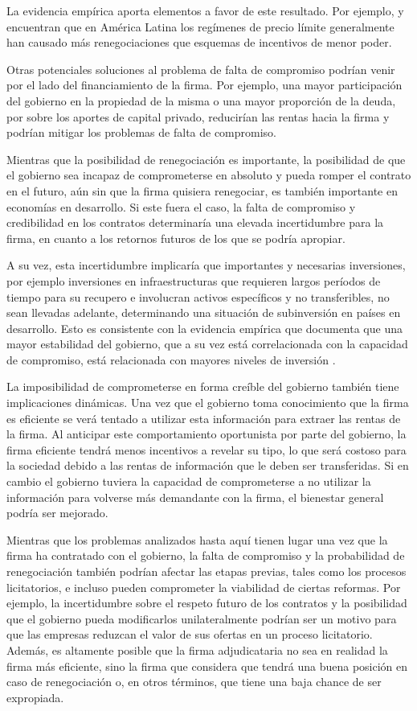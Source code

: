 \documentclass[
  12pt,
  spanish,
]{book}
\begin{document}
La evidencia empírica aporta elementos a favor de este resultado. Por
ejemplo, \citet{Guasch2007} y \citet{Guasch2008} encuentran que en
América Latina los regímenes de precio límite generalmente han causado
más renegociaciones que esquemas de incentivos de menor poder.

Otras potenciales soluciones al problema de falta de compromiso podrían
venir por el lado del financiamiento de la firma. Por ejemplo, una mayor
participación del gobierno en la propiedad de la misma o una mayor
proporción de la deuda, por sobre los aportes de capital privado,
reducirían las rentas hacia la firma y podrían mitigar los problemas de
falta de compromiso.

Mientras que la posibilidad de renegociación es importante, la
posibilidad de que el gobierno sea incapaz de comprometerse en absoluto
y pueda romper el contrato en el futuro, aún sin que la firma quisiera
renegociar, es también importante en economías en desarrollo. Si este
fuera el caso, la falta de compromiso y credibilidad en los contratos
determinaría una elevada incertidumbre para la firma, en cuanto a los
retornos futuros de los que se podría apropiar.

A su vez, esta incertidumbre implicaría que importantes y necesarias
inversiones, por ejemplo inversiones en infraestructuras que requieren
largos períodos de tiempo para su recupero e involucran activos
específicos y no transferibles, no sean llevadas adelante, determinando
una situación de subinversión en países en desarrollo. Esto es
consistente con la evidencia empírica que documenta que una mayor
estabilidad del gobierno, que a su vez está correlacionada con la
capacidad de compromiso, está relacionada con mayores niveles de
inversión \citep{Banerjee2006}.

La imposibilidad de comprometerse en forma creíble del gobierno también
tiene implicaciones dinámicas. Una vez que el gobierno toma conocimiento
que la firma es eficiente se verá tentado a utilizar esta información
para extraer las rentas de la firma. Al anticipar este comportamiento
oportunista por parte del gobierno, la firma eficiente tendrá menos
incentivos a revelar su tipo, lo que será costoso para la sociedad
debido a las rentas de información que le deben ser transferidas. Si en
cambio el gobierno tuviera la capacidad de comprometerse a no utilizar
la información para volverse más demandante con la firma, el bienestar
general podría ser mejorado.

Mientras que los problemas analizados hasta aquí tienen lugar una vez
que la firma ha contratado con el gobierno, la falta de compromiso y la
probabilidad de renegociación también podrían afectar las etapas
previas, tales como los procesos licitatorios, e incluso pueden
comprometer la viabilidad de ciertas reformas. Por ejemplo, la
incertidumbre sobre el respeto futuro de los contratos y la posibilidad
que el gobierno pueda modificarlos unilateralmente podrían ser un motivo
para que las empresas reduzcan el valor de sus ofertas en un proceso
licitatorio. Además, es altamente posible que la firma adjudicataria no
sea en realidad la firma más eficiente, sino la firma que considera que
tendrá una buena posición en caso de renegociación o, en otros términos,
que tiene una baja chance de ser expropiada.
\end{document}
